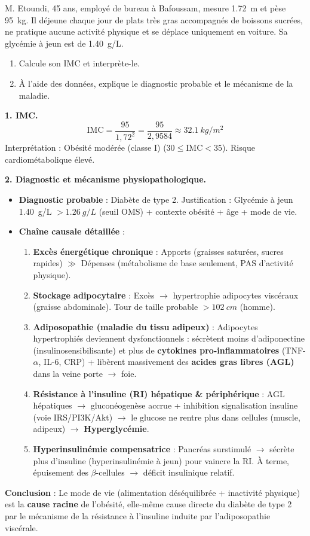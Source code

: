 \documentclass[11pt]{article}
\newcommand{\cle}[1]{{\popxbold\color{popdark}#1}}
\begin{document}
\begin{exoresolu}
M. Etoundi, 45 ans, employé de bureau à Bafoussam, mesure \SI{1,72}{m} et pèse \SI{95}{kg}. Il déjeune chaque jour de plats très gras accompagnés de boissons sucrées, ne pratique aucune activité physique et se déplace uniquement en voiture. Sa glycémie à jeun est de \SI{1,40}{g/L}.
\begin{enumerate}
\item Calcule son IMC et interprète-le.
\item À l'aide des données, explique le diagnostic probable et le mécanisme de la maladie.
\end{enumerate}
\tcblower
\textbf{1. IMC.}
\[\mathrm{IMC} = \dfrac{95}{1,72^2} = \dfrac{95}{2,9584} \approx \SI{32,1}{kg/m^2}\]
Interprétation : \cle{Obésité modérée (classe I)} ($30 \le \mathrm{IMC} < 35$). Risque cardiométabolique élevé.

\textbf{2. Diagnostic et mécanisme physiopathologique.}

\begin{itemize}
\item \textbf{Diagnostic probable} : \cle{Diabète de type 2}. Justification : Glycémie à jeun \SI{1,40}{g/L} $> \SI{1,26}{g/L}$ (seuil OMS) + contexte obésité + âge + mode de vie.
\item \textbf{Chaîne causale détaillée} :
\begin{enumerate}
\item \textbf{Excès énergétique chronique} : Apports (graisses saturées, sucres rapides) $\gg$ Dépenses (métabolisme de base seulement, PAS d'activité physique).
\item \textbf{Stockage adipocytaire} : Excès $\rightarrow$ hypertrophie adipocytes viscéraux (graisse abdominale). Tour de taille probable $> \SI{102}{cm}$ (homme).
\item \textbf{Adiposopathie (maladie du tissu adipeux)} : Adipocytes hypertrophiés deviennent dysfonctionnels : sécrètent moins d'adiponectine (insulinosensibilisante) et plus de \textbf{cytokines pro-inflammatoires} (TNF-$\alpha$, IL-6, CRP) + libèrent massivement des \textbf{acides gras libres (AGL)} dans la veine porte $\rightarrow$ foie.
\item \textbf{Résistance à l'insuline (RI) hépatique \& périphérique} : AGL hépatiques $\rightarrow$ gluconéogenèse accrue + inhibition signalisation insuline (voie IRS/PI3K/Akt) $\rightarrow$ le glucose ne rentre plus dans cellules (muscle, adipeux) $\rightarrow$ \textbf{Hyperglycémie}.
\item \textbf{Hyperinsulinémie compensatrice} : Pancréas surstimulé $\rightarrow$ sécrète plus d'insuline (hyperinsulinémie à jeun) pour vaincre la RI. À terme, épuisement des $\beta$-cellules $\rightarrow$ déficit insulinique relatif.
\end{enumerate}
\end{itemize}
\textbf{Conclusion} : Le mode de vie (alimentation déséquilibrée + inactivité physique) est la \textbf{cause racine} de l'obésité, elle-même cause directe du diabète de type 2 par le mécanisme de la résistance à l'insuline induite par l'adiposopathie viscérale.
\end{exoresolu}
\end{document}

